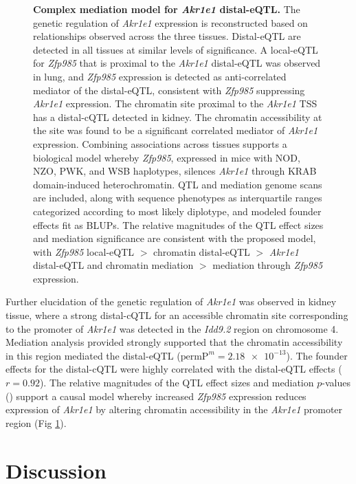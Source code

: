 \documentclass[10pt,letterpaper]{article}
\newcommand{\permpmed}{\text{permP}^{m}}
\begin{document}
\begin{figure}[h!]
\caption{\textbf{Complex mediation model for \textit{Akr1e1} distal-eQTL.}  The genetic regulation of \textit{Akr1e1} expression is reconstructed based on relationships observed across the three tissues. Distal-eQTL are detected in all tissues at similar levels of significance. A local-eQTL for \textit{Zfp985} that is proximal to the \textit{Akr1e1} distal-eQTL was observed in lung, and \textit{Zfp985} expression is detected as anti-correlated mediator of the distal-eQTL, consistent with \textit{Zfp985} suppressing \textit{Akr1e1} expression. The chromatin site proximal to the \textit{Akr1e1} TSS has a distal-cQTL detected in kidney. The chromatin accessibility at the site was found to be a significant correlated mediator of \textit{Akr1e1} expression. Combining associations across tissues supports a biological model whereby \textit{Zfp985}, expressed in mice with NOD, NZO, PWK, and WSB haplotypes, silences \textit{Akr1e1} through KRAB domain-induced heterochromatin. QTL and mediation genome scans are included, along with sequence phenotypes as interquartile ranges categorized according to most likely diplotype, and modeled founder effects fit as BLUPs. The relative magnitudes of the QTL effect sizes and mediation significance are consistent with the proposed model, with \textit{Zfp985} local-eQTL $>$ chromatin distal-eQTL $>$ \textit{Akr1e1} distal-eQTL and chromatin mediation $>$ mediation through \textit{Zfp985} expression.
\label{fig:akr1e1_full_model}}
\end{figure}
  
Further elucidation of the genetic regulation of \textit{Akr1e1} was observed in kidney tissue, where a strong distal-cQTL for an accessible chromatin site corresponding to the promoter of \textit{Akr1e1} was detected in the \textit{Idd9.2} region on chromosome 4. Mediation analysis provided strongly supported that the chromatin accessibility in this region mediated the distal-eQTL ($\permpmed = \num{2.18e-13}$). The founder effects for the distal-cQTL were highly correlated with the distal-eQTL effects ($r = 0.92$). The relative magnitudes of the QTL effect sizes and mediation $p$-values () support a causal model whereby increased \textit{Zfp985} expression reduces expression of \textit{Akr1e1} by altering chromatin accessibility in the \textit{Akr1e1} promoter region (Fig \ref{fig:akr1e1_full_model}). 

\section*{Discussion}
\end{document}
